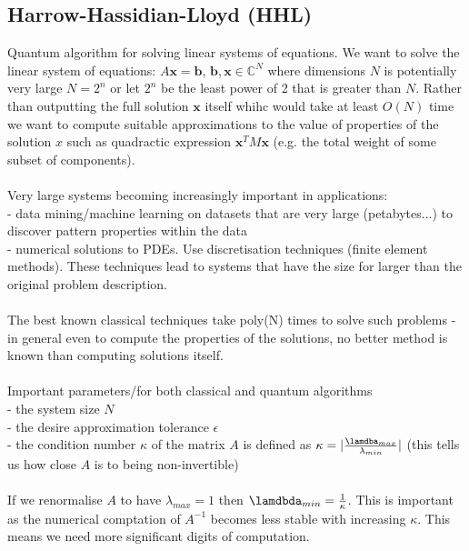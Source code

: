\documentclass{article}
\begin{document}
\subsection{Harrow-Hassidian-Lloyd (HHL)}
Quantum algorithm for solving linear systems of equations. We want to solve the linear system of equations: $A\bm x = \bm b$, $\bm b, \bm x \in \mathbb{C}^N$ where dimensions $N$ is potentially very large $N=2^n$ or let $2^n$ be the least power of 2 that is greater than $N$. Rather than outputting the full solution $\bm x$ itself whihc would take at least $O(N)$ time we want to compute suitable approximations to the value of properties of the solution $x$ such as quadractic expression $\bm x^TM \bm x$ (e.g. the total weight of some subset of components).\\\\
Very large systems becoming increasingly important in applications:\\
- data mining/machine learning on datasets that are very large (petabytes...) to discover pattern properties within the data\\
- numerical solutions to PDEs. Use discretisation techniques (finite element methods). These techniques lead to systems that have the size for larger than the original problem description. \\\\
The best known classical techniques take poly(N) times to solve such problems - in general even to compute the properties of the solutions, no better method is known than computing solutions itself. \\\\
Important parameters/for both classical and quantum algorithms\\
- the system size $N$\\
- the desire approximation tolerance $\epsilon$\\
- the condition number $\kappa$ of the matrix $A$ is defined as $\kappa = | \frac{\lamdba_{max}}{\lambda_{min}}|$ (this tells us how close $A$ is to being non-invertible)\\\\
If we renormalise $A$ to have $\lambda_{max} =1$ then $\lamdbda_{min} = \frac{1}{\kappa}$. This is important as the numerical comptation of $A^{-1}$ becomes less stable with increasing $\kappa$. This means we need more significant digits of computation.
\end{document}
